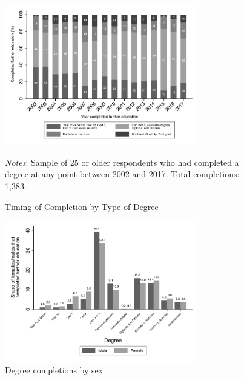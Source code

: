\documentclass[12pt, a4paper]{article}
\begin{document}
\begin{figure}[H]
\centering
\caption{Timing of Completion by Type of Degree}
\vspace{0.5cm}
  \label{fig:yearcompdeg}
    \includegraphics[width=0.75\textwidth]{_figures/year_completed_bydegree.pdf}
\parbox{1\textwidth}{\footnotesize{\textit{Notes}: Sample of 25 or older respondents who had completed a degree at any point between 2002 and 2017. Total completions: 1,383.}}
\end{figure}


\begin{figure}[H]
\centering
\caption{Degree completions by sex}
\vspace{0.5cm}
  \label{fig:degbysex}
    \includegraphics[width=0.75\textwidth]{_figures/completions_by_gender_deg.pdf}
\end{figure}
\end{document}
